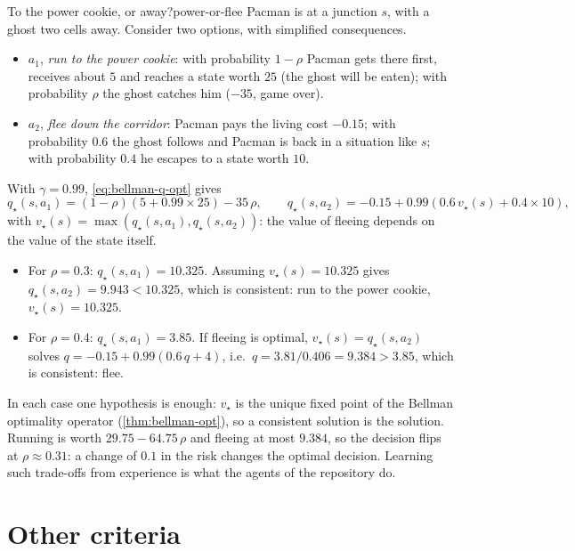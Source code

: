 \begin{pacman}{To the power cookie, or away?}{power-or-flee}
  Pacman is at a junction $s$, with a ghost two cells away. Consider two
  options, with simplified consequences.
  \begin{itemize}[nosep]
    \item $a_1$, \emph{run to the power cookie}: with probability $1 - \rho$
      Pacman gets there first, receives about $5$ and reaches a state worth
      $25$ (the ghost will be eaten); with probability $\rho$ the ghost
      catches him ($-35$, game over).
    \item $a_2$, \emph{flee down the corridor}: Pacman pays the living cost
      $-0.15$; with probability $0.6$ the ghost follows and Pacman is back
      in a situation like $s$; with probability $0.4$ he escapes to a state
      worth $10$.
  \end{itemize}
  With $\gamma = 0.99$, \eqref{eq:bellman-q-opt} gives
  \begin{equation*}
    q_\star(s, a_1) = (1 - \rho)(5 + 0.99 \times 25) - 35\,\rho, \qquad
    q_\star(s, a_2) = -0.15 + 0.99 \left( 0.6\, v_\star(s) + 0.4 \times 10
    \right),
  \end{equation*}
  with $v_\star(s) = \max(q_\star(s, a_1), q_\star(s, a_2))$: the value of
  fleeing depends on the value of the state itself.
  \begin{itemize}[nosep]
    \item For $\rho = 0.3$: $q_\star(s, a_1) = 10.325$. Assuming $v_\star(s)
      = 10.325$ gives $q_\star(s, a_2) = 9.943 < 10.325$, which is
      consistent: run to the power cookie, $v_\star(s) = 10.325$.
    \item For $\rho = 0.4$: $q_\star(s, a_1) = 3.85$. If fleeing is optimal,
      $v_\star(s) = q_\star(s, a_2)$ solves $q = -0.15 + 0.99 (0.6\, q + 4)$,
      i.e.\ $q = 3.81 / 0.406 = 9.384 > 3.85$, which is consistent: flee.
  \end{itemize}
  In each case one hypothesis is enough: $v_\star$ is the unique fixed point
  of the Bellman optimality operator (\cref{thm:bellman-opt}), so a
  consistent solution is the solution. Running is worth $29.75 - 64.75\,\rho$
  and fleeing at most $9.384$, so the decision flips at $\rho \approx 0.31$:
  a change of $0.1$ in the risk changes the optimal decision. Learning such
  trade-offs from experience is what the agents of the repository do.
\end{pacman}

\section{Other criteria}

